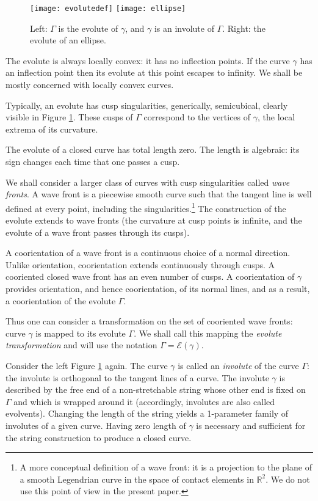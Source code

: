 \documentclass[12pt]{article}
\newcommand{\R}{\mathbb {R}}
\newcommand{\g}{{\gamma}}
\newcommand{\G}{{\Gamma}}
\begin{document}
\begin{figure}[hbtp]
\centering
\texttt{[image: evolutedef]}\quad\quad\quad
\texttt{[image: ellipse]}
\caption{Left: $\G$ is the evolute of $\g$, and $\g$ is an involute of $\G$. Right: the evolute of an ellipse.}
\label{evolutedef}
\end{figure}

The evolute is always locally convex: it has no inflection points. If the curve $\g$ has an inflection point then its evolute at this point escapes to infinity. We shall be mostly concerned with locally convex curves.

Typically, an evolute has cusp singularities, generically, semicubical, clear\-ly visible in Figure \ref{evolutedef}. These cusps of $\G$ correspond to the vertices of $\g$, the local extrema of its curvature. 

The evolute of a closed curve has total length zero. The length is algebraic: its sign changes each time that one passes a cusp.

We shall consider a larger class of curves with cusp singularities called {\it wave fronts}. A wave front is a piecewise smooth curve such that the tangent line is well defined at every point, including the singularities.\footnote{A more conceptual definition of a wave front: it is a projection to the plane of a smooth Legendrian curve in the space of contact elements in $\R^2$. We do not use this point of view in the present paper.} The construction of the evolute extends to wave fronts (the curvature at cusp points is infinite, and the evolute of a wave front passes through its cusps).

A coorientation of a wave front is a continuous choice of a normal direction. Unlike orientation, coorientation extends continuously through cusps. A cooriented closed wave front has an even number of cusps. A coorientation of $\g$ provides orientation, and hence coorientation, of its normal lines, and as a result, a coorientation of the evolute $\G$.

Thus one can consider a transformation on the set of cooriented wave fronts: curve $\gamma$ is mapped to its evolute $\Gamma$. We shall call this mapping the \emph{evolute transformation} and will use the notation $\G=\mathcal{E}(\g)$.

Consider the left Figure \ref{evolutedef} again. The curve $\g$ is called an {\it involute} of the curve $\G$: the involute  is orthogonal to the tangent lines of a curve. The involute $\g$ is described by the free end of a non-stretchable string whose other end is fixed on   $\G$ and which is wrapped around it (accordingly, involutes are also called evolvents). Changing the length of the string yields a 1-parameter family of involutes of a given curve.
 Having zero length of $\g$ is necessary and sufficient for the string construction to produce a closed curve.
 
\end{document}
